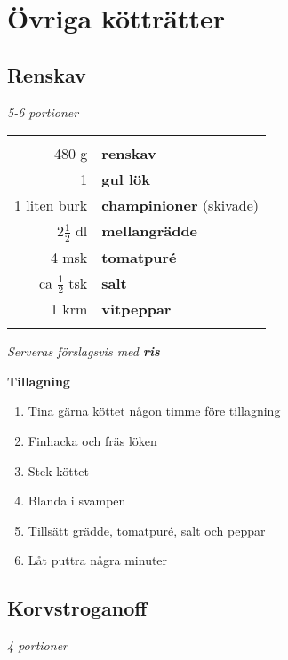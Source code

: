 \documentclass[a4paper,12pt]{article}
\newcommand{\port}[1]{\noindent \textit{#1 portioner}}
\newcommand{\tillb}[1]{\noindent \textit{Serveras förslagsvis med \textbf{#1}} \vspace{1cm}}
\begin{document}
\section{Övriga kötträtter}

\clearpage

\subsection{Renskav}
\port{5-6}

\begin{table}[H]
	\begin{tabular}{rl}
	\hline
	&\\
		480 g & \textbf{renskav}\\
		1 & \textbf{gul lök}\\
		1 liten burk & \textbf{champinioner} (skivade)\\
		2$\frac{1}{2}$ dl & \textbf{mellangrädde}\\
		4 msk & \textbf{tomatpuré}\\
		ca $\frac{1}{2}$ tsk & \textbf{salt}\\
		1 krm & \textbf{vitpeppar}\\
	&\\
	\hline
	\end{tabular}
\end{table}

\tillb{ris}

\begin{multicols*}{2}

\noindent \textbf{Tillagning}
\begin{enumerate}
	\itemsep0cm
	\item Tina gärna köttet någon timme före tillagning
	\item Finhacka och fräs löken
	\item Stek köttet
	\item Blanda i svampen
	\item Tillsätt grädde, tomatpuré, salt och peppar
	\item Låt puttra några minuter
\end{enumerate}

\end{multicols*}

\clearpage

\subsection{Korvstroganoff}
\port{4}
\end{document}

